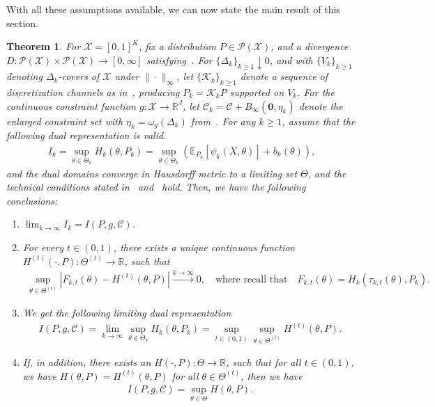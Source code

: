 \documentclass{article}
\theoremstyle{plain}
\newtheorem{theorem}{Theorem}[section]
\theoremstyle{definition}
\newcommand{\lrp}[1]{\left( #1 \right)}
\newcommand{\R}{\mathbb{R}}
\newcommand{\calP}{\mathcal P}
\newcommand{\calC}{\mathcal C}
\newcommand{\calX}{\mathcal X}
\newcommand{\calK}{\mathcal{K}}
\newcommand{\qtext}[1]{\quad \text{#1} \quad}
\begin{document}
With all these assumptions available, we can now state the main result of this section. 


\begin{theorem}
    \label{theorem:general-approximate-constraint} For $\calX = [0,1]^K$, fix a distribution $P \in \calP(\calX)$, and a divergence $D: \calP(\calX) \times \calP(\calX) \to [0, \infty]$ satisfying~. For $\{\Delta_k\}_{k \geq 1} \downarrow 0$, and with $\{V_k\}_{k \geq 1}$ denoting $\Delta_k$-covers of $\calX$ under $\|\cdot\|_\infty$, let $\{\calK_k\}_{k \geq 1}$ denote a sequence of discretization channels as in~, producing $P_k = \calK_k P$ supported on $V_k$. For the continuous constraint function $g:\calX \to \R^J$, let $\calC_k = \calC + B_\infty(\boldsymbol{0}, \eta_k)$ denote the enlarged constraint set with $\eta_k = \omega_g(\Delta_k)$ from~. For any $k \geq 1$, assume that the following dual representation is valid.  
    \begin{align}
        I_k = \sup_{\theta \in \Theta_k} H_k(\theta, P_k)  = \sup_{\theta \in \Theta_k} \lrp{ \mathbb{E}_{P_k}[\psi_k(X, \theta)] + b_k(\theta)}, 
    \end{align}
    and the dual domains converge in Hausdorff metric to a limiting set $\Theta$, and the  technical conditions stated in~ and~ hold. Then, we have the following conclusions: 
    \begin{enumerate}
        \item  $\lim_{k \to \infty} I_k = I(P, g, \calC)$. 
        \item For every $t \in (0, 1)$, there exists a unique continuous function $H^{(t)}(\cdot, P): \Theta^{(t)} \to \R$, such that 
        \begin{align}
            \sup_{\theta \in \Theta^{(t)}} \left\lvert F_{k,t}(\theta) - H^{(t)}(\theta, P) \right\rvert \stackrel{k \to \infty}{\longrightarrow} 0, \qtext{where recall that} F_{k,t}(\theta) = H_k(\tau_{k,t}(\theta), P_k).  
        \end{align}
        \item We get the following limiting dual representation 
        \begin{align}
            I(P, g, \calC) = \lim_{k \to \infty} \sup_{\theta \in \Theta_k} H_k(\theta, P_k) = \sup_{t \in (0,1)} \sup_{\theta \in \Theta^{(t)}} H^{(t)}(\theta, P). 
        \end{align}
        \item If, in addition, there exists an $H(\cdot, P): \Theta \to \R$, such that for all $t \in (0, 1)$, we have $H(\theta, P) = H^{(t)}(\theta, P)$ for all $\theta \in \Theta^{(t)}$, then we have 
        \begin{align}
            I(P, g, \calC) = \sup_{\theta \in \Theta} H(\theta, P). 
        \end{align}
    \end{enumerate}
\end{theorem}
\end{document}
